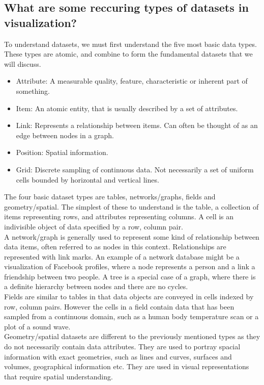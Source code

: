 \documentclass[12pt]{article}
\begin{document}
\subsection{What are some reccuring types of datasets in visualization?}
To understand datasets, we must first understand the five most basic data types. These types are atomic, and combine to form the fundamental datasets that we will discuss.
\begin{itemize}
	\item Attribute: A measurable quality, feature, characteristic or inherent part of something.
	\item Item: An atomic entity, that is usually described by a set of attributes.
	\item Link: Represents a relationship between items. Can often be thought of as an edge between nodes in a graph.
	\item Position: Spatial information.
	\item Grid: Discrete sampling of continuous data. Not necessarily a set of uniform cells bounded by horizontal and vertical lines.
\end{itemize}

The four basic dataset types are tables, networks/graphs, fields and geometry/spatial. The simplest of these to understand is the table, a collection of items representing rows, and attributes representing columns. A cell is an indivisible object of data specified by a row, column pair. \\

A network/graph is generally used to represent some kind of relationship between data items, often referred to as nodes in this context. Relationships are represented with link marks. An example of a network database might be a visualization of Facebook profiles, where a node represents a person and a link a friendship between two people. A tree is a special case of a graph, where there is a definite hierarchy between nodes and there are no cycles. \\

Fields are similar to tables in that data objects are conveyed in cells indexed by row, column pairs. However the cells in a field contain data that has been sampled from a continuous domain, such as a human body temperature scan or a plot of a sound wave. \\

Geometry/spatial datasets are different to the previously mentioned types as they do not necessarily contain data attributes. They are used to portray spacial information with exact geometries, such as lines and curves, surfaces and volumes, geographical information etc. They are used in visual representations that require spatial understanding.
\end{document}
